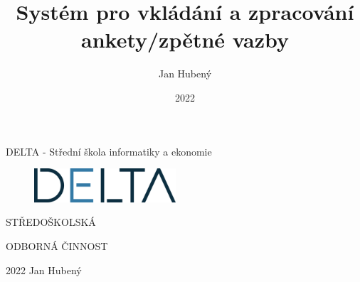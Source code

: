 \documentclass[hidelinks, 12pt, a4paper,
twoside,        %
openright
]{report}
\title{Systém pro vkládání a zpracování ankety/zpětné vazby} %
\author{Jan Hubený} %
\date{2022} %
\begin{document}
	
	\pagestyle{empty}
	
	\begin{titlepage}
		\bfseries{
			\begin{center}
				\fontsize{19}{2}\selectfont DELTA - Střední škola informatiky a ekonomie
				
				\vspace{0.035\textheight}
				
				\begin{figure}[H]
					\centering
					\includegraphics[width=0.47\textwidth]{logo.png}
					
				\end{figure}
				
				\vspace{0.26\textheight}
				
				
				\huge{STŘEDOŠKOLSKÁ}
				
				\huge{ODBORNÁ ČINNOST}
				
				
				\vspace{0.37\textheight}
				
				\noindent\LARGE{2022   Jan Hubený}
				
			\end{center}
		}
	\end{titlepage}
	
\end{document}
